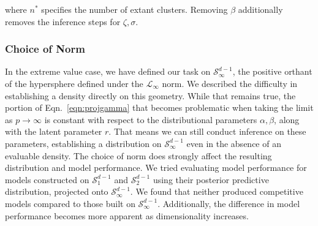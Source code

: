   where $n^*$ specifies the number of extant clusters.  Removing $\beta$ additionally removes the
  inference steps for $\zeta,\sigma$.

\subsubsection{Choice of Norm}
In the extreme value case, we have defined our task on $\mathcal{S}_{\infty}^{d-1}$, the positive orthant
  of the hypersphere defined under the $\mathcal{L}_{\infty}$ norm.  We described the difficulty in
  establishing a density directly on this geometry.
  While that remains true, the portion of
  Eqn.~\ref{eqn:projgamma} that becomes problematic when taking the limit as $p\to\infty$ is constant
  with respect to the distributional parameters $\alpha,\beta$, along with the latent parameter $r$.
  That means we can still conduct inference on these parameters, establishing a distribution on
  $\mathcal{S}_{\infty}^{d-1}$ even in the absence of an evaluable density.   The choice of norm does
  strongly affect the resulting distribution and model performance.  We tried evaluating model performance
  for models constructed on $\mathcal{S}_1^{d-1}$ and $\mathcal{S}_2^{d-1}$ using their posterior
  predictive distribution, projected onto $\mathcal{S}_{\infty}^{d-1}$.  We found that neither produced
  competitive models compared to those built on $\mathcal{S}_{\infty}^{d-1}$.  Additionally, the
  difference in model performance becomes more apparent as dimensionality increases.





